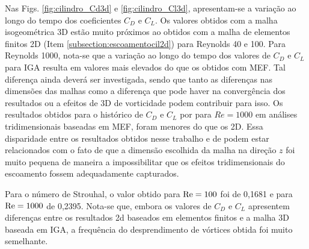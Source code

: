 \documentclass[tese_patricia]{subfiles}
\begin{document}
Nas Figs. \ref{fig:cilindro_Cd3d} e \ref{fig:cilindro_Cl3d}, apresentam-se a variação ao longo do tempo dos coeficientes $C_{D}$ e $C_{L}$. Os valores obtidos com a malha isogeométrica 3D estão muito próximos ao obtidos com a malha de elementos finitos 2D (Item \ref{subsection:escoamentocil2d}) para Reynolds 40 e 100. Para Reynolds 1000, nota-se que a variação ao longo do tempo dos valores de $C_{D}$ e $C_{L}$ para IGA resulta em valores mais elevados do que os obtidos com MEF. Tal diferença ainda deverá ser investigada, sendo que tanto as diferenças nas dimensões das malhas como a diferença que pode haver na convergência dos resultados ou a efeitos de 3D de vorticidade podem contribuir para isso. Os resultados obtidos para o histórico de $C_{D}$ e $C_{L}$ por  para $Re = 1000$ em análises tridimensionais baseadas em MEF, foram menores do que os 2D. Essa disparidade entre os resultados obtidos nesse trabalho e de  podem estar relacionados com o fato de que a dimensão escolhida da malha na direção $z$ foi muito pequena de maneira a impossibilitar que os efeitos tridimensionais do escoamento fossem adequadamente capturados.

Para o número de Strouhal, o valor obtido para $\mathrm{Re} = 100$ foi de 0,1681 e para $\mathrm{Re} = 1000$ de 0,2395. Nota-se que, embora os valores de $C_{D}$ e $C_{L}$ apresentem diferenças entre os resultados 2d baseados em elementos finitos e a malha 3D baseada em IGA, a frequência do desprendimento de vórtices obtida foi muito semelhante.
\end{document}
